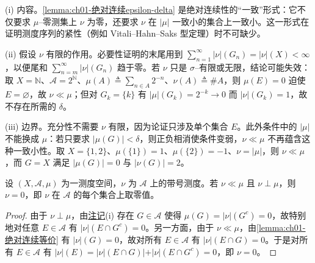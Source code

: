 \documentclass[../../main.tex]{subfiles}%
\begin{document}
\begin{remark}\label{remark:ch01-绝对连续epsilon-delta动机}
(i) 内容。\cref{lemma:ch01-绝对连续epsilon-delta} 是绝对连续性的“一致”形式：它不仅要求 $\mu$--零测集上 $\nu$ 为零，还要求 $\nu$ 在 $|\mu|$ 一致小的集合上一致小。这一形式在证明测度序列的紧性（例如 Vitali--Hahn--Saks 型定理）时不可缺少。

(ii) 假设 $\nu$ 有限的作用。必要性证明的末尾用到 $\sum_{n=1}^\infty|\nu|(G_n)=|\nu|(X)<\infty$，以便尾和 $\sum_{n=m}^\infty|\nu|(G_n)$ 趋于零。若 $\nu$ 只是 $\sigma$--有限或无限，结论可能失效：取 $X=\mathbb{N}$、$\mathcal{A}=2^{\mathbb{N}}$、$\mu(A)\triangleq\sum_{n\in A}2^{-n}$、$\nu(A)\triangleq\#A$，则 $\mu(E)=0$ 迫使 $E=\varnothing$，故 $\nu\ll\mu$；但对 $G_k=\{k\}$ 有 $|\mu|(G_k)=2^{-k}\to0$ 而 $|\nu|(G_k)=1$，故不存在所需的 $\delta$。

(iii) 边界。充分性不需要 $\nu$ 有限，因为论证只涉及单个集合 $E$。此外条件中的 $|\mu|$ 不能换成 $\mu$：若只要求 $|\mu(G)|<\delta$，则正负相消使条件变弱，$\nu\ll\mu$ 不再蕴含这种一致小性。取 $X=\{1,2\}$、$\mu(\{1\})=1$、$\mu(\{2\})=-1$、$\nu=|\mu|$，则 $\nu\ll\mu$，而 $G=X$ 满足 $|\mu(G)|=0$ 与 $|\nu(G)|=2$。
\end{remark}

\begin{lemma}\label{lemma:ch01-既绝对连续又奇异}
设 $(X,\mathcal{A},\mu)$ 为一测度空间，$\nu$ 为 $\mathcal{A}$ 上的带号测度。若 $\nu\ll\mu$ 且 $\nu\perp\mu$，则 $\nu=0$，即 $\nu$ 在 $\mathcal{A}$ 的每个集合上取零值。
\end{lemma}

\begin{proof}
由于 $\nu\perp\mu$，由\hyperref[remark:ch01-奇异绝对连续注记]{注记}(i) 存在 $G\in\mathcal{A}$ 使得 $\mu(G)=|\nu|(G^c)=0$，故特别地对任意 $E\in\mathcal{A}$ 有 $|\nu|(E\cap G^c)=0$。另一方面，由于 $\nu\ll\mu$，由\cref{lemma:ch01-绝对连续等价} 有 $|\nu|(G)=0$，故对所有 $E\in\mathcal{A}$ 有 $|\nu|(E\cap G)=0$。于是对所有 $E\in\mathcal{A}$ 有 $|\nu|(E)=|\nu|(E\cap G)|+|\nu|(E\cap G^c)=0$，即 $\nu=0$。
\end{proof}
\end{document}
